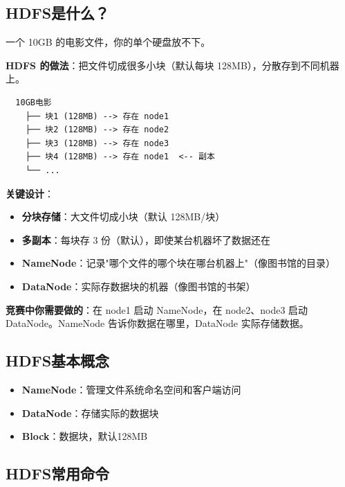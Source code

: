 \documentclass[12pt,a4paper]{article}
\begin{document}
\subsection{HDFS是什么？}

\begin{theorybox}
一个 10GB 的电影文件，你的单个硬盘放不下。

\textbf{HDFS 的做法}：把文件切成很多小块（默认每块 128MB），分散存到不同机器上。

\begin{verbatim}
  10GB电影
    ├── 块1 (128MB) --> 存在 node1
    ├── 块2 (128MB) --> 存在 node2
    ├── 块3 (128MB) --> 存在 node3
    ├── 块4 (128MB) --> 存在 node1  <-- 副本
    └── ...
\end{verbatim}

\textbf{关键设计}：
\begin{itemize}
    \item \textbf{分块存储}：大文件切成小块（默认 128MB/块）
    \item \textbf{多副本}：每块存 3 份（默认），即使某台机器坏了数据还在
    \item \textbf{NameNode}：记录"哪个文件的哪个块在哪台机器上"（像图书馆的目录）
    \item \textbf{DataNode}：实际存数据块的机器（像图书馆的书架）
\end{itemize}

\textbf{竞赛中你需要做的}：在 node1 启动 NameNode，在 node2、node3 启动 DataNode。NameNode 告诉你数据在哪里，DataNode 实际存储数据。
\end{theorybox}

\subsection{HDFS基本概念}

\begin{theorybox}[HDFS架构]
\begin{itemize}
    \item \textbf{NameNode}：管理文件系统命名空间和客户端访问
    \item \textbf{DataNode}：存储实际的数据块
    \item \textbf{Block}：数据块，默认128MB
\end{itemize}
\end{theorybox}

\subsection{HDFS常用命令}
\end{document}
